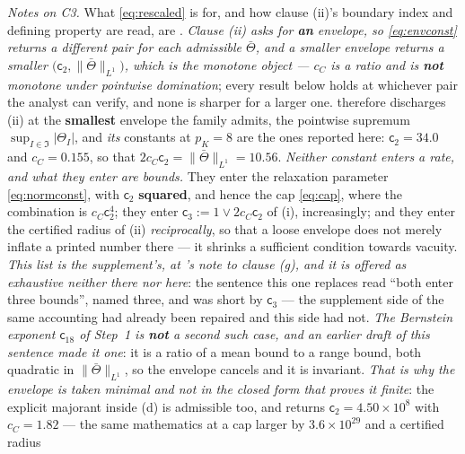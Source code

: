 \noindent\emph{Notes on C3.} What \eqref{eq:rescaled} is for, and how clause (ii)'s boundary index and
defining property are read, are . \emph{Clause \textup{(ii)} asks for
\textbf{an} envelope, so \eqref{eq:envconst} returns a different pair for each admissible $\bar\Theta$,
and a smaller envelope returns a smaller $\big(\mathsf c_2,\|\bar\Theta\|_{L^{1}}\big)$, which is the
monotone object --- $c_C$ is a ratio and is \textbf{not} monotone under pointwise domination}; every result below holds at whichever pair the analyst
can verify, and none is sharper for a larger one.  therefore discharges
\textup{(ii)} at the \textbf{smallest} envelope the family admits, the pointwise supremum
$\sup_{I\in\mathfrak I}|\Theta_I|$, and \emph{its} constants at $p_K=8$ are the ones reported here:
$\mathsf c_2=34.0$ and $c_C=0.155$, so that $2c_C\mathsf c_2=\|\bar\Theta\|_{L^{1}}=10.56$.
\emph{Neither constant enters a rate, and what they enter are bounds.} They enter the relaxation parameter
\eqref{eq:normconst}, with $\mathsf c_2$ \textbf{squared}, and hence the cap \eqref{eq:cap}, where the
combination is $c_C\mathsf c_2^{4}$; they enter $\mathsf c_3:=1\vee2c_C\mathsf c_2$ of
\textup{(i)}, increasingly; and they enter the certified radius of
\textup{(ii)} \emph{reciprocally}, so that a loose envelope does not merely inflate a printed number
there --- it shrinks a sufficient condition towards vacuity. \emph{This list is the supplement's, at
's note to clause \textup{(g)}, and it is offered as exhaustive neither there
nor here}: the sentence this one replaces read ``both enter three bounds'', named three, and was
short by $\mathsf c_3$ --- the supplement side of the same accounting had already been repaired and
this side had not. \emph{The Bernstein exponent
$\mathsf c_{18}$ of  Step~1 is \textbf{not} a second such case, and an
earlier draft of this sentence made it one}: it is a ratio of a mean bound to a range bound, both
quadratic in $\|\bar\Theta\|_{L^{1}}$, so the envelope cancels and it is invariant. \emph{That is why the
envelope is taken minimal and not in the closed form that proves it finite}: the explicit majorant
inside \textup{(d)} is admissible too, and returns $\mathsf c_2=4.50\times10^{8}$
with $c_C=1.82$ --- the same mathematics at a cap larger by $3.6\times10^{29}$ and a certified radius
